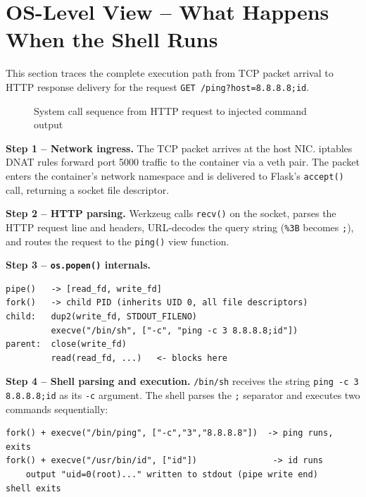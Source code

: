 \vspace{0.3cm}

\section{OS-Level View -- What Happens When the Shell Runs}

This section traces the complete execution path from TCP packet arrival to HTTP response delivery for the request \texttt{GET /ping?host=8.8.8.8;id}.

\begin{figure}[h]
\centering
\vspace{3cm}
\caption{System call sequence from HTTP request to injected command output}
\end{figure}

\textbf{Step 1 -- Network ingress.} The TCP packet arrives at the host NIC. iptables DNAT rules forward port 5000 traffic to the container via a veth pair. The packet enters the container's network namespace and is delivered to Flask's \texttt{accept()} call, returning a socket file descriptor.

\textbf{Step 2 -- HTTP parsing.} Werkzeug calls \texttt{recv()} on the socket, parses the HTTP request line and headers, URL-decodes the query string (\texttt{\%3B} becomes \texttt{;}), and routes the request to the \texttt{ping()} view function.

\textbf{Step 3 -- \texttt{os.popen()} internals.}

\begin{lstlisting}
pipe()   -> [read_fd, write_fd]
fork()   -> child PID (inherits UID 0, all file descriptors)
child:   dup2(write_fd, STDOUT_FILENO)
         execve("/bin/sh", ["-c", "ping -c 3 8.8.8.8;id"])
parent:  close(write_fd)
         read(read_fd, ...)   <- blocks here
\end{lstlisting}

\textbf{Step 4 -- Shell parsing and execution.} \texttt{/bin/sh} receives the string \texttt{ping -c 3 8.8.8.8;id} as its \texttt{-c} argument. The shell parses the \texttt{;} separator and executes two commands sequentially:

\begin{lstlisting}
fork() + execve("/bin/ping", ["-c","3","8.8.8.8"])  -> ping runs, exits
fork() + execve("/usr/bin/id", ["id"])               -> id runs
    output "uid=0(root)..." written to stdout (pipe write end)
shell exits
\end{lstlisting}

